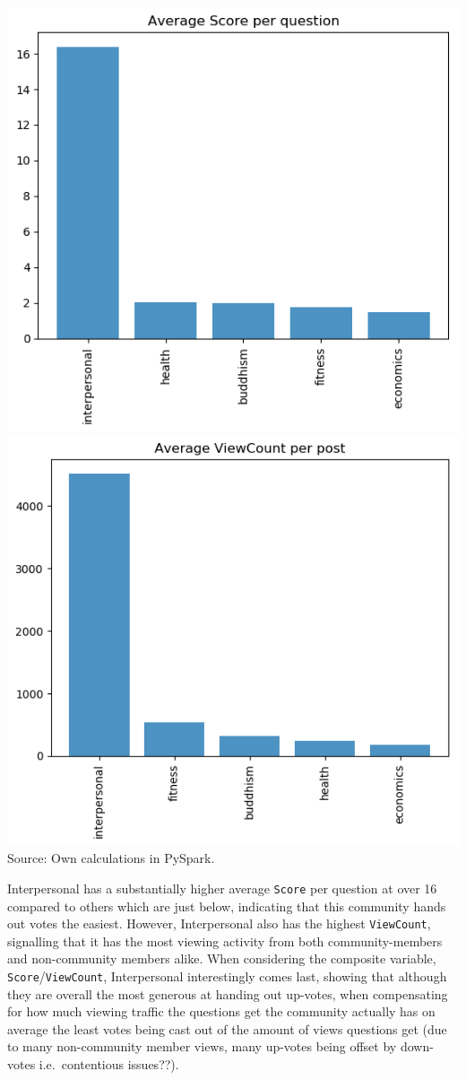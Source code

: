 \documentclass[11pt,preprint, authoryear]{article}
\let\origfigure\figure
\let\endorigfigure\endfigure
\renewenvironment{figure}[1][2] {
    \expandafter\origfigure\expandafter[H]
} {
    \endorigfigure
}
\numberwithin{equation}{section}
\begin{document}
\normalsize

\footnotesize

\begin{figure}
\caption{\textbf{Fora Descriptives}}
\label{fig:desc}
\begin{minipage}{1\textwidth}

\includegraphics[width=0.49\linewidth]{../../01-python-code/00-workspace/01-graphs/ave-score-bar-graph} 
\includegraphics[width=0.49\linewidth]{../../01-python-code/00-workspace/01-graphs/ave-views-bar-graph} 
\\ \centering
{\footnotesize Source: Own calculations in PySpark.}
\end{minipage}
\end{figure}

\normalsize

Interpersonal has a substantially higher average \texttt{Score} per
question at over 16 compared to others which are just below, indicating
that this community hands out votes the easiest. However, Interpersonal
also has the highest \texttt{ViewCount}, signalling that it has the most
viewing activity from both community-members and non-community members
alike. When considering the composite variable,
\texttt{Score}/\texttt{ViewCount}, Interpersonal interestingly comes
last, showing that although they are overall the most generous at
handing out up-votes, when compensating for how much viewing traffic the
questions get the community actually has on average the least votes
being cast out of the amount of views questions get (due to many
non-community member views, many up-votes being offset by down-votes
i.e.~contentious issues??).
\end{document}
